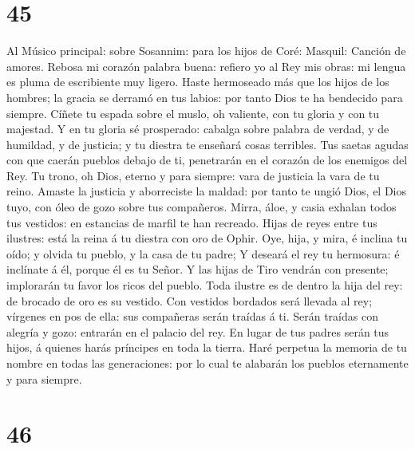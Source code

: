 \hypertarget{section-44}{%
\section{45}\label{section-44}}

 Al Músico principal: sobre Sosannim: para los hijos de
Coré: Masquil: Canción de amores. Rebosa mi corazón palabra buena:
refiero yo al Rey mis obras: mi lengua es pluma de escribiente muy
ligero.  Haste hermoseado más que los hijos de los
hombres; la gracia se derramó en tus labios: por tanto Dios te ha
bendecido para siempre.  Cíñete tu espada sobre el muslo,
oh valiente, con tu gloria y con tu majestad.  Y en tu
gloria sé prosperado: cabalga sobre palabra de verdad, y de humildad, y
de justicia; y tu diestra te enseñará cosas terribles. 
Tus saetas agudas con que caerán pueblos debajo de ti, penetrarán en el
corazón de los enemigos del Rey.  Tu trono, oh Dios,
eterno y para siempre: vara de justicia la vara de tu reino.
 Amaste la justicia y aborreciste la maldad: por tanto te
ungió Dios, el Dios tuyo, con óleo de gozo sobre tus compañeros.
 Mirra, áloe, y casia exhalan todos tus vestidos: en
estancias de marfil te han recreado.  Hijas de reyes entre
tus ilustres: está la reina á tu diestra con oro de Ophir.
 Oye, hija, y mira, é inclina tu oído; y olvida tu
pueblo, y la casa de tu padre;  Y deseará el rey tu
hermosura: é inclínate á él, porque él es tu Señor.  Y
las hijas de Tiro vendrán con presente; implorarán tu favor los ricos
del pueblo.  Toda ilustre es de dentro la hija del rey:
de brocado de oro es su vestido.  Con vestidos bordados
será llevada al rey; vírgenes en pos de ella: sus compañeras serán
traídas á ti.  Serán traídas con alegría y gozo: entrarán
en el palacio del rey.  En lugar de tus padres serán tus
hijos, á quienes harás príncipes en toda la tierra.  Haré
perpetua la memoria de tu nombre en todas las generaciones: por lo cual
te alabarán los pueblos eternamente y para siempre.

\hypertarget{section-45}{%
\section{46}\label{section-45}}

